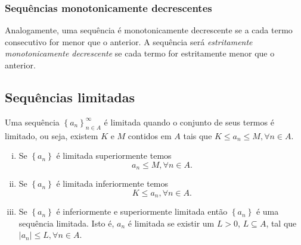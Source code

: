             \subsubsection{Sequências monotonicamente decrescentes}
               Analogamente, uma sequência é monotonicamente decrescente se a cada termo consecutivo for menor que o anterior. A sequência será \emph{estritamente monotonicamente decrescente} se cada termo for estritamente menor que o anterior.
      
   \subsection{Sequências limitadas}
      \begin{definition}
         Uma sequência $\left\{a_{n}\right\}^{\infty}_{n \in A}$ é limitada quando o conjunto de seus termos é limitado, ou seja, existem $K$ e $M$ contidos em $A$ tais que $K \leq a_{n} \leq M, \forall n \in A$.
         \begin{enumerate}[i.]
            \item Se $\left\{a_{n}\right\}$ é limitada superiormente temos $$a_{n} \leq M,\forall n \in A.$$
            \item Se $\left\{a_{n}\right\}$ é limitada inferiormente temos $$K \leq a_{n}, \forall n \in A.$$
            \item Se $\left\{a_{n}\right\}$ é inferiormente e superiormente
               limitada então $\left\{a_{n}\right\}$ é uma sequência limitada.
               Isto é, ${a_{n}}$ é limitada se existir um $L > 0$, $L \subseteq A$, tal que
               $|a_{n}| \leq L, \forall n \in A$.
         \end{enumerate}
      \end{definition}
